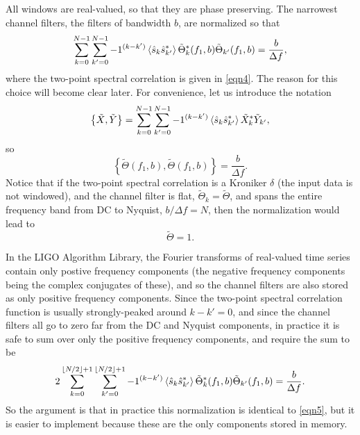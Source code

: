 \documentclass{article}
\begin{document}
All windows are real-valued, so that they are phase preserving.  The
narrowest channel filters, the filters of bandwidth \(b\),  are normalized
so that
\begin{equation}
\label{eqn5}
\sum_{k = 0}^{N - 1} \sum_{k' = 0}^{N - 1} -1^{(k - k')} \left\langle\hat{s}_{k}
\hat{s}^{*}_{k'}\right\rangle \tilde{\Theta}^{*}_{k}(f_{1}, b)
\tilde{\Theta}_{k'}(f_{1}, b)
   = \frac{b}{\Delta f},
\end{equation}
where the two-point spectral correlation is given in \eqref{eqn4}.  The
reason for this choice will become clear later.  For convenience, let us
introduce the notation
\begin{equation}
\left\{ \tilde{X}, \tilde{Y} \right\}
   = \sum_{k = 0}^{N - 1} \sum_{k' = 0}^{N - 1} -1^{(k - k')}
   \left\langle\hat{s}_{k} \hat{s}^{*}_{k'}\right\rangle \tilde{X}^{*}_{k}
   \tilde{Y}_{k'},
\end{equation}
so
\begin{equation}
\left\{ \tilde{\Theta}(f_{1}, b), \tilde{\Theta}(f_{1}, b) \right\}
   = \frac{b}{\Delta f}.
\end{equation}
Notice that if the two-point spectral correlation is a Kroniker \(\delta\)
(the input data is not windowed), and the channel filter is flat,
\(\tilde{\Theta}_{k} = \tilde{\Theta}\), and spans the entire frequency
band from DC to Nyquist, \(b / \Delta f = N\), then the normalization would
lead to
\begin{equation}
\tilde{\Theta}
   = 1.
\end{equation}

In the LIGO Algorithm Library, the Fourier transforms of real-valued time
series contain only postive frequency components (the negative frequency
components being the complex conjugates of these), and so the channel
filters are also stored as only positive frequency components.  Since the
two-point spectral correlation function is usually strongly-peaked around
\(k - k' = 0\), and since the channel filters all go to zero far from the
DC and Nyquist components, in practice it is safe to sum over only the
positive frequency components, and require the sum to be
\begin{equation}
2 \sum_{k = 0}^{\lfloor N / 2 \rfloor + 1} \sum_{k' = 0}^{\lfloor N / 2
\rfloor + 1} -1^{(k - k')} \left\langle\hat{s}_{k} \hat{s}^{*}_{k'}\right\rangle
\tilde{\Theta}^{*}_{k}(f_{1}, b) \tilde{\Theta}_{k'}(f_{1}, b)
   = \frac{b}{\Delta f}.
\end{equation}
So the argument is that in practice this normalization is identical to
\eqref{eqn5}, but it is easier to implement because these are the only
components stored in memory.
\end{document}
